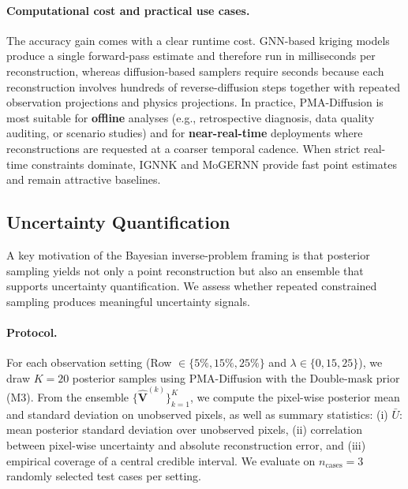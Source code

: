 \documentclass[a4paper,fleqn]{cas-sc}
\numberwithin{equation}{section}
\begin{document}
\paragraph{Computational cost and practical use cases.}
The accuracy gain comes with a clear runtime cost. GNN-based kriging models produce a single forward-pass estimate and therefore run in milliseconds per reconstruction, whereas diffusion-based samplers require seconds because each reconstruction involves hundreds of reverse-diffusion steps together with repeated observation projections and physics projections. In practice, PMA-Diffusion is most suitable for \textbf{offline} analyses (e.g., retrospective diagnosis, data quality auditing, or scenario studies) and for \textbf{near-real-time} deployments where reconstructions are requested at a coarser temporal cadence. When strict real-time constraints dominate, IGNNK and MoGERNN provide fast point estimates and remain attractive baselines.

\subsection{Uncertainty Quantification}
\label{sec:exp_uncertainty}

A key motivation of the Bayesian inverse-problem framing is that posterior sampling yields not only a point reconstruction but also an ensemble that supports uncertainty quantification. We assess whether repeated constrained sampling produces meaningful uncertainty signals.

\paragraph{Protocol.}
For each observation setting (Row $\in\{5\%,15\%,25\%\}$ and $\lambda\in\{0,15,25\}$), we draw $K=20$ posterior samples using PMA-Diffusion with the Double-mask prior (M3). From the ensemble $\{\hat{\mathbf{V}}^{(k)}\}_{k=1}^K$, we compute the pixel-wise posterior mean and standard deviation on unobserved pixels, as well as summary statistics:
(i) $\bar{U}$: mean posterior standard deviation over unobserved pixels,
(ii) correlation between pixel-wise uncertainty and absolute reconstruction error, and
(iii) empirical coverage of a central credible interval.
We evaluate on $n_{\text{cases}}=3$ randomly selected test cases per setting.
\end{document}
